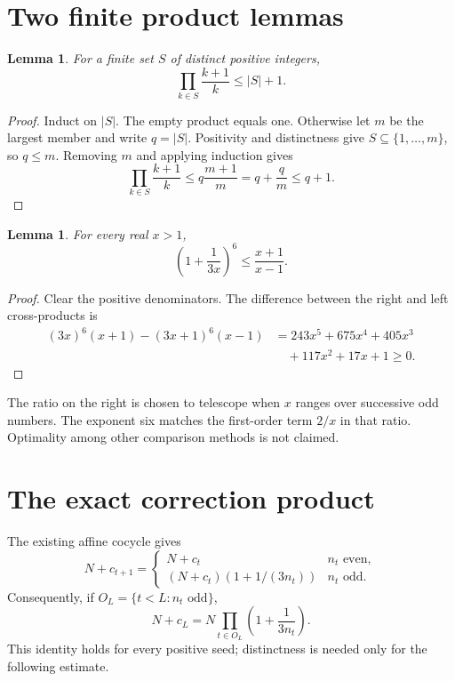 \documentclass[11pt]{article}
\newtheorem{lemma}[theorem]{Lemma}
\begin{document}
\section{Two finite product lemmas}
\begin{lemma}\label{lem:product}
For a finite set $S$ of distinct positive integers,
\[
\prod_{k\in S}\frac{k+1}{k}\le |S|+1.
\]
\end{lemma}
\begin{proof}
Induct on $|S|$. The empty product equals one. Otherwise let $m$ be the largest member and write $q=|S|$. Positivity and distinctness give $S\subseteq\{1,\ldots,m\}$, so $q\le m$. Removing $m$ and applying induction gives
\[
\prod_{k\in S}\frac{k+1}{k}
\le q\frac{m+1}{m}=q+\frac qm\le q+1.
\]
\end{proof}

\begin{lemma}\label{lem:local}
For every real $x>1$,
\[
\left(1+\frac1{3x}\right)^6\le\frac{x+1}{x-1}.
\]
\end{lemma}
\begin{proof}
Clear the positive denominators. The difference between the right and left cross-products is
\begin{align*}
(3x)^6(x+1)-(3x+1)^6(x-1)
&=243x^5+675x^4+405x^3\\
&\quad+117x^2+17x+1\ge0.
\end{align*}
\end{proof}
The ratio on the right is chosen to telescope when $x$ ranges over successive odd numbers. The exponent six matches the first-order term $2/x$ in that ratio. Optimality among other comparison methods is not claimed.

\section{The exact correction product}
The existing affine cocycle gives
\[
N+c_{t+1}=
\begin{cases}
N+c_t&n_t\text{ even},\\
(N+c_t)(1+1/(3n_t))&n_t\text{ odd}.
\end{cases}
\]
Consequently, if $O_L=\{t<L:n_t\text{ odd}\}$,
\begin{equation}\label{eq:product}
N+c_L=N\prod_{t\in O_L}\left(1+\frac1{3n_t}\right).
\end{equation}
This identity holds for every positive seed; distinctness is needed only for the following estimate.

\newpage
\end{document}
